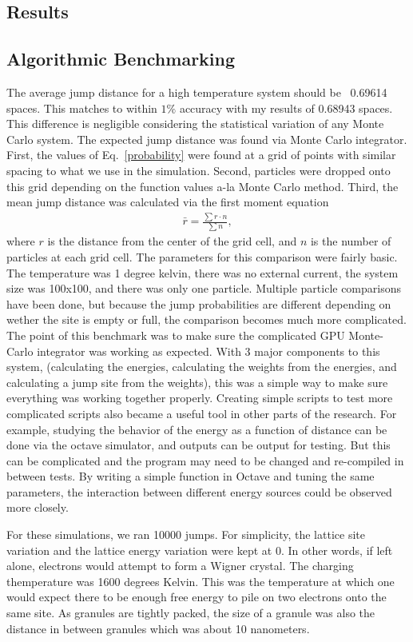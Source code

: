 \subsection{Results}
\subsection{Algorithmic Benchmarking}
The average jump distance for a high temperature system should be ~0.69614 spaces. This matches to within $1\%$ accuracy with my results of 0.68943 spaces. This difference is negligible considering the statistical variation of any Monte Carlo system. The expected jump distance was found via Monte Carlo integrator. First, the values of Eq.~\ref{probability} were found at a grid of points with similar spacing to what we use in the simulation. Second, particles were dropped onto this grid depending on the function values a-la Monte Carlo method. Third, the mean jump distance was calculated via the first moment equation
\begin{eqnarray}
\bar r = \frac {\sum r \cdot n} {\sum n}, 
\label{firstMoment}
\end{eqnarray}
where $r$ is the distance from the center of the grid cell, and $n$ is the number of particles at each grid cell. The parameters for this comparison were fairly basic. The temperature was 1 degree kelvin, there was no external current, the system size was 100x100, and there was only one particle. Multiple particle comparisons have been done, but because the jump probabilities are different depending on wether the site is empty or full, the comparison becomes much more complicated. The point of this benchmark was to make sure the complicated GPU Monte-Carlo integrator was working as expected. With 3 major components to this system, (calculating the energies, calculating the weights from the energies, and calculating a jump site from the weights), this was a simple way to make sure everything was working together properly. Creating simple scripts to test more complicated scripts also became a useful tool in other parts of the research. For example, studying the behavior of the energy as a function of distance can be done via the octave simulator, and outputs can be output for testing. But this can be complicated and the program may need to be changed and re-compiled in between tests. By writing a simple function in Octave and tuning the same parameters, the interaction between different energy sources could be observed more closely.

For these simulations, we ran 10000 jumps. For simplicity, the lattice site variation and the lattice energy variation were kept at 0. In other words, if left alone, electrons would attempt to form a Wigner crystal. The charging themperature was 1600 degrees Kelvin. This was the temperature at which one would expect there to be enough free energy to pile on two electrons onto the same site. As granules are tightly packed, the size of a granule was also the distance in between granules which was about 10 nanometers. 

